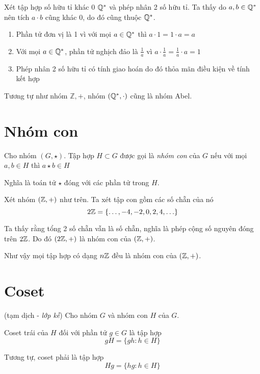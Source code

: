 \begin{example}
    Xét tập hợp số hữu tỉ khác 0 $\mathbb{Q}^*$ và phép nhân 2 số hữu tỉ. Ta thấy do $a, b \in \mathbb{Q}^*$ nên tích $a \cdot b$ cũng khác 0, do đó cũng thuộc $\mathbb{Q}^*$.
    \begin{enumerate}[noitemsep]
        \item Phần tử đơn vị là 1 vì với mọi $a \in \mathbb{Q}^*$ thì $a \cdot 1 = 1 \cdot a = a$
        \item Với mọi $a \in \mathbb{Q}^*$, phần tử nghịch đảo là $\frac{1}{a}$ vì $a \cdot \frac{1}{a} = \frac{1}{a} \cdot a = 1$
        \item Phép nhân 2 số hữu tỉ có tính giao hoán do đó thỏa mãn điều kiện về tính kết hợp
    \end{enumerate}
    Tương tự như nhóm $\mathbb{Z, +}$, nhóm $(\mathbb{Q}^*, \cdot)$ cũng là nhóm Abel.
\end{example}

\section{Nhóm con}

\begin{definition}
    Cho nhóm $(G, \star)$. Tập hợp $H \subset G$ được gọi là \textit{nhóm con} của $G$ nếu với mọi $a, b \in H$ thì $a \star b \in H$
\end{definition}
 
Nghĩa là toán tử $\star$ đóng với các phần tử trong $H$.

\begin{example}
    Xét nhóm $(\mathbb{Z}, +)$ như trên. Ta xét tập con gồm các số chẵn của nó
    \[2\mathbb{Z} = \{\ldots, -4, -2, 0, 2, 4, \ldots\}\]

    Ta thấy rằng tổng 2 số chẵn vẫn là số chẵn, nghĩa là phép cộng số nguyên đóng trên $2\mathbb{Z}$.
    Do đó $(2\mathbb{Z}, +)$ là nhóm con của $(\mathbb{Z}, +)$.

    Như vậy mọi tập hợp có dạng $n \mathbb{Z}$ đều là nhóm con của $(\mathbb{Z}, +)$.
\end{example}

\section{Coset}

\begin{definition}[Coset]
    (tạm dịch - \textit{lớp kề}) Cho nhóm $G$ và nhóm con $H$ của $G$.

    Coset trái của $H$ đối với phần tử $g \in G$ là tập hợp
    \[gH = \{gh : h \in H \}\]

    Tương tự, coset phải là tập hợp
    \[Hg = \{hg : h \in H \}\]
\end{definition}

